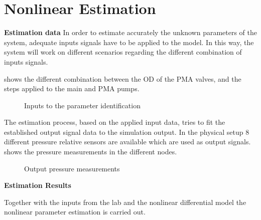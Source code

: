 \chapter{Nonlinear Estimation}
\label{NonLinResults}

\textbf{Estimation data}
In order to estimate accurately the unknown parameters of the system, adequate inputs signals have to be applied to the model. In this way, the system 
will work on different scenarios regarding the different combination of inputs signals. 

 shows the different combination between the OD of the PMA valves, and the steps applied to the main and PMA pumps. 

\begin{figure}[H]
\centering
\resizebox{0.75\linewidth}{!}{}
% 
\caption{Inputs to the parameter identification}
\label{systemdiagram}
\end{figure} 

The estimation process, based on the applied input data, tries to fit the established output signal data to the simulation output. In the physical setup $8$ 
different pressure relative sensors are available which are used as output signals.  shows the pressure measurements in the different 
nodes.

\begin{figure}[H]
\centering
\resizebox{0.75\linewidth}{!}{}
% 
\caption{Output pressure measurements}
\label{systemdiagram1}
\end{figure} 

\textbf{Estimation Results}

Together with the inputs from the lab and the nonlinear differential model the nonlinear parameter estimation is carried out. 



